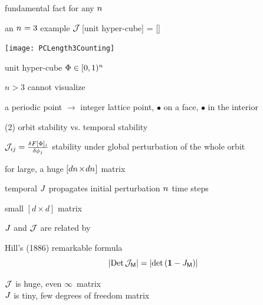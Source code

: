 \begin{frame}{fundamental fact for any ${n_{}}$}

    \begin{block}{an ${n_{}}=3$ example} %
${\cal J}\,$[unit hyper-cube] = [{\fundPip}]
\begin{center}
            \begin{minipage}[c]{0.32\textwidth}\begin{center}
\texttt{[image: PCLength3Counting]}
            \end{center}\end{minipage}
            \hspace{2ex}
            \begin{minipage}[c]{0.46\textwidth}
unit hyper-cube $\Phi\in[0,1)^{n_{}}$
\bigskip\bigskip

{\footnotesize $n>3$ cannot visualize}
            \end{minipage}
\end{center}
    \end{block}
    {\footnotesize
a periodic point $\rightarrow$ integer lattice point,
{\color{red}$\bullet$} on a face,
{\color{blue}$\bullet$} in the interior
    }
\end{frame}

\begin{frame}{(2) orbit stability vs. temporal stability}
\begin{block}{\jacobianOrb}
\(
{\cal J}_{ij} =\frac{\delta F[\Phi]_i}{\delta \phi_j}
\)
stability under {\color{blue}global} perturbation of the whole orbit

\hfill for \cl{} large, a huge $[d{n_{}}\!\times\!d{n_{}}]$ matrix
\end{block}
\begin{block}{temporal {\jacobianM}}
\(
\jMps%
\)
propagates {\color{blue}initial} perturbation ${n_{}}$ time steps

\hfill small $[d\!\times\!d]$ matrix
\end{block}
\vfill

$J$ and ${\cal J}$ are related by
\begin{block}{Hill's (1886) remarkable formula}
\[
|\mbox{\rm Det}\,{\cal J}_{\mathsf{M}}| = |\mbox{\rm det}\,({\bf 1} - J_{\mathsf{M}})|
\]
\end{block}
${\cal J}$ is {\color{red}huge}, even $\infty$\dmn\ matrix\\
$J$ is {\color{red}tiny}, few degrees of freedom matrix
\end{frame}

